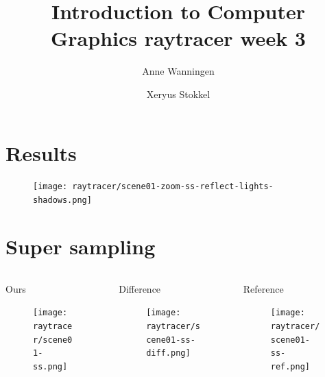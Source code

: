 \documentclass{beamer}
\author{Anne Wanningen \and Xeryus Stokkel}
\title[Week 3]{Introduction to Computer Graphics raytracer week 3}
\begin{document}
\maketitle

\section{Results}
\begin{frame}
	\begin{figure}
		\texttt{[image: raytracer/scene01-zoom-ss-reflect-lights-shadows.png]}
	\end{figure}
\end{frame}

\section{Super sampling}
\begin{frame}
	\begin{columns}[T]
		\begin{column}{.3\textwidth}
			Ours
			\begin{figure}
				\texttt{[image: raytracer/scene01-ss.png]}
			\end{figure}
		\end{column}
		\begin{column}{.3\textwidth}
			Difference
			\begin{figure}
				\texttt{[image: raytracer/scene01-ss-diff.png]}
			\end{figure}
		\end{column}
		\begin{column}{.3\textwidth}
			Reference
			\begin{figure}
				\texttt{[image: raytracer/scene01-ss-ref.png]}
			\end{figure}
		\end{column}
	\end{columns}
\end{frame}
\end{document}
